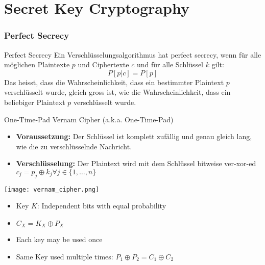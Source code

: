 \section{Secret Key Cryptography}


\subsubsection{Perfect Secrecy}

\begin{theorem}{Perfect Secrecy}
    Ein Verschlüsselungsalgorithmus hat perfect secrecy, wenn für alle möglichen Plaintexte $p$ und Ciphertexte $c$ und für alle Schlüssel $k$ gilt:
    \begin{equation}
        P[p|c] = P[p]
    \end{equation}
    Das heisst, dass die Wahrscheinlichkeit, dass ein bestimmter Plaintext $p$ verschlüsselt wurde, gleich gross ist, wie die Wahrscheinlichkeit, dass ein beliebiger Plaintext $p$ verschlüsselt wurde.
\end{theorem}

\begin{concept}{One-Time-Pad} Vernam Cipher (a.k.a. One-Time-Pad)
    \begin{itemize}
        \item \textbf{Voraussetzung:} Der Schlüssel ist komplett zufällig und genau gleich lang, wie die zu verschlüsselnde Nachricht.
        \item \textbf{Verschlüsselung:}
        Der Plaintext wird mit dem Schlüssel bitweise ver-xor-ed
        $c_j = p_j \oplus k_j \forall j \in \{1, \dots, n\}$
    \end{itemize}
    \texttt{[image: vernam\_cipher.png]}
    \begin{itemize}
        \item Key $K$: Independent bits with equal probability
        \item $C_X = K_X \oplus P_X$
        \item Each key may be used once
        \item Same Key used multiple times: $P_1 \oplus P_2 = C_1 \oplus C_2$
    \end{itemize}
\end{concept}



